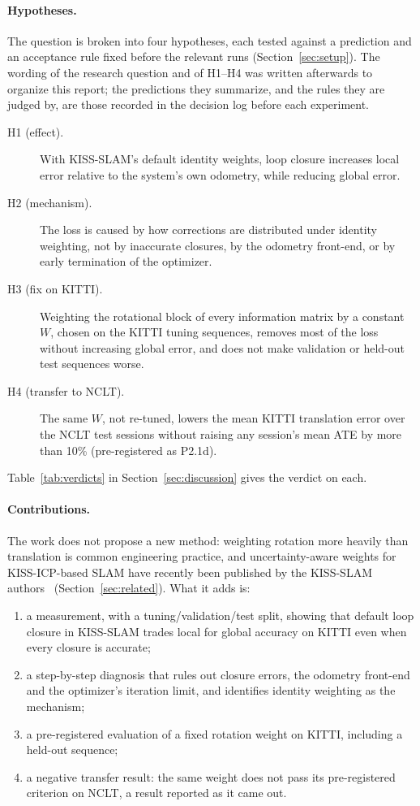 \documentclass[11pt,a4paper]{article}
\begin{document}
\paragraph{Hypotheses.} The question is broken into four hypotheses, each tested against a prediction and an
acceptance rule fixed before the relevant runs (Section~\ref{sec:setup}). The wording of the research question
and of H1--H4 was written afterwards to organize this report; the predictions they summarize, and the rules
they are judged by, are those recorded in the decision log before each experiment.
\begin{description}
  \item[H1 (effect).] With KISS-SLAM's default identity weights, loop closure increases local error
        relative to the system's own odometry, while reducing global error.
  \item[H2 (mechanism).] The loss is caused by how corrections are distributed under identity weighting, not
        by inaccurate closures, by the odometry front-end, or by early termination of the optimizer.
  \item[H3 (fix on KITTI).] Weighting the rotational block of every information matrix by a constant $W$,
        chosen on the KITTI tuning sequences, removes most of the loss without increasing global error, and
        does not make validation or held-out test sequences worse.
  \item[H4 (transfer to NCLT).] The same $W$, not re-tuned, lowers the mean KITTI translation error over the
        NCLT test sessions without raising any session's mean ATE by more than 10\% (pre-registered as P2.1d).
\end{description}
Table~\ref{tab:verdicts} in Section~\ref{sec:discussion} gives the verdict on each.

\paragraph{Contributions.} The work does not propose a new method: weighting rotation more heavily than
translation is common engineering practice, and uncertainty-aware weights for KISS-ICP-based SLAM have recently
been published by the KISS-SLAM authors~\cite{retroslam} (Section~\ref{sec:related}). What it adds is:
\begin{enumerate}
  \item a measurement, with a tuning/validation/test split, showing that default loop closure in KISS-SLAM
        trades local for global accuracy on KITTI even when every closure is accurate;
  \item a step-by-step diagnosis that rules out closure errors, the odometry front-end and the optimizer's
        iteration limit, and identifies identity weighting as the mechanism;
  \item a pre-registered evaluation of a fixed rotation weight on KITTI, including a held-out sequence;
  \item a negative transfer result: the same weight does not pass its pre-registered criterion on NCLT, a result
        reported as it came out.
\end{enumerate}
\end{document}
